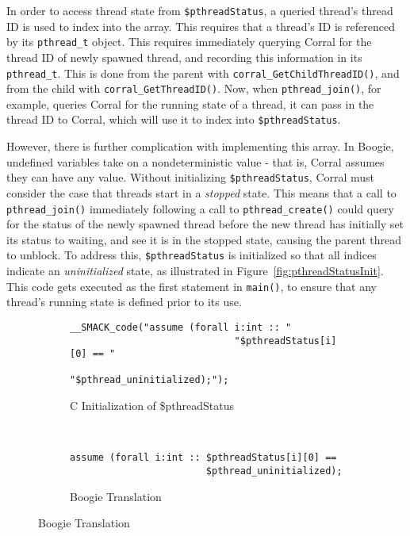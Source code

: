 In order to access thread state from \lstinline|$pthreadStatus|, a
queried thread's thread ID is used to index into the array.  This
requires that a thread's ID is referenced by its
\lstinline|pthread_t| object.  This requires immediately querying
Corral for the thread ID of newly spawned thread, and recording this
information in its \lstinline|pthread_t|.  This is done from the
parent with \lstinline|corral_GetChildThreadID()|, and from the child
with \lstinline|corral_GetThreadID()|.  Now, when
\lstinline|pthread_join()|, for example, queries Corral for the
running state of a thread, it can pass in the thread ID to Corral,
which will use it to index into \lstinline|$pthreadStatus|.

However, there is further complication with implementing this
array. In Boogie, undefined variables take on a nondeterministic value
- that is, Corral assumes they can have any value.  Without
initializing \lstinline|$pthreadStatus|, Corral must consider the case
that threads start in a \emph{stopped} state.  This means that a call
to \lstinline|pthread_join()| immediately following a call to
\lstinline|pthread_create()| could query for the status of the newly
spawned thread before the new thread has initially set its status to
waiting, and see it is in the stopped state, causing the parent thread
to unblock.  To address this, \lstinline|$pthreadStatus| is
initialized so that all indices indicate an \emph{uninitialized} state,
as illustrated in Figure~\ref{fig:pthreadStatusInit}.  This code gets
executed as the first statement in \lstinline|main()|, to ensure that
any thread's running state is defined prior to its use.

\begin{figure}[h]
\centering
\caption{Initializing Global \$pthreadStatus}\label{fig:pthreadStatusInit}
\begin{subfigure}[b]{1\textwidth}
\centering
\caption{C Initialization of \$pthreadStatus}\label{fig:pthreadStatusInit_a}
\begin{lstlisting}
__SMACK_code("assume (forall i:int :: "
                             "$pthreadStatus[i][0] == "
                             "$pthread_uninitialized);"); 
\end{lstlisting}
\end{subfigure}
~
\begin{subfigure}[b]{1\textwidth}
\centering
\caption{Boogie Translation}\label{fig:pthreadStatusInit_b}
\begin{lstlisting}[language=boogie]
assume (forall i:int :: $pthreadStatus[i][0] == 
                        $pthread_uninitialized);
\end{lstlisting}
\end{subfigure}
\end{figure}

